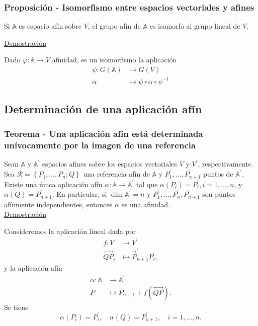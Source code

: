 \documentclass[12pt, a4paper, ones, notitlepage, openany,titlepage]{article}
\newcommand{\demostracion}{\noindent\underline{Demostración}}
\begin{document}
\subsubsection{Proposición - Isomorfismo entre espacios vectoriales y afines}
\noindent Si $\mathbb{A}$ es espacio afín sobre $V$, el grupo afín de $\mathbb{A}$ es isomorfo al grupo lineal de $V$.

\demostracion

\noindent Dado $\varphi : \mathbb{A} \longrightarrow V$ afinidad, es un isomorfismo la aplicación
$$
\begin{aligned}
\psi : G(\mathbb{A}) & \longrightarrow G(V) \\
\alpha & \longmapsto \psi \circ \alpha \circ \psi^{-1}
\end{aligned}
$$

\subsection{Determinación de una aplicación afín}

\subsubsection{Teorema - Una aplicación afín está determinada unívocamente por la imagen de una referencia} Sean $\mathbb{A}$ y $\mathbb{A}^{\prime}$ espacios afines sobre los espacios vectoriales $V$ y $V^{\prime}$, respectivamente. Sea $\mathcal{R}=\left\{P_{1}, \ldots, P_{n} ; Q\right\}$ una referencia afín de $\mathbb{A}$ y $P_{1}^{\prime}, \ldots, P_{n+1}^{\prime}$ puntos de $\mathbb{A}^{\prime}$. Existe una única aplicación afín $\alpha: \mathbb{A} \rightarrow \mathbb{A}^{\prime}$ tal que $\alpha\left(P_{i}\right)=P_{i}^{\prime}, i=1, \ldots, n$, y $\alpha(Q)=P_{n+1}^{\prime}$. En particular, si $\dim  \mathbb{A}^{\prime}=n$ y $P_{1}^{\prime}, \ldots, P_{n}^{\prime}, P_{n+1}^{\prime}$ son puntos afínmente independientes, entonces $\alpha$ es una afinidad.\\

\demostracion

\noindent Consideremos la aplicación lineal dada por
$$
\begin{aligned}
f: V & \longrightarrow V^{\prime} \\
\overrightarrow{Q P}_{i} & \longmapsto \overrightarrow{P}_{n+1}^{\prime} P_{i}^{\prime},
\end{aligned}
$$
\noindent y la aplicación afín
$$
\begin{aligned}
\alpha: \mathbb{A} & \longrightarrow \mathbb{A}^{\prime} \\
P & \longmapsto P_{n+1}^{\prime}+f(\overrightarrow{Q P}) .
\end{aligned}
$$
\noindent Se tiene
$$
\alpha\left(P_{i}\right)=P_{i}^{\prime}, \quad \alpha(Q)=P_{n+1}^{\prime}, \quad i=1, \ldots, n .
$$
\end{document}
